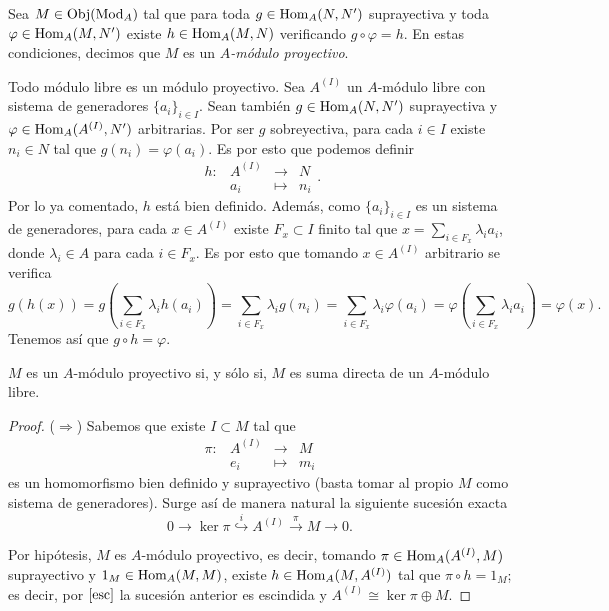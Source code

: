 \documentclass[../main.tex]{subfiles}
\begin{document}
\begin{definition}
	Sea $M\in\text{Obj}(\text{Mod}_A)$ tal que para toda $g\in\text{Hom}_A(N,N')$ suprayectiva y toda $\varphi\in\text{Hom}_A(M,N')$ existe $h\in\text{Hom}_A(M,N)$ verificando $g\circ\varphi=h$. En estas condiciones, decimos que $M$ es un \textit{$A$-módulo proyectivo}.
\end{definition}
\begin{remark}
	Todo módulo libre es un módulo proyectivo. Sea $A^{(I)}$ un $A$-módulo libre con sistema de generadores $\{a_i\}_{i\in I}$. Sean también $g\in\text{Hom}_A(N,N')$ suprayectiva y $\varphi\in\text{Hom}_A(A^{(I)},N')$ arbitrarias. Por ser $g$ sobreyectiva, para cada $i\in I$ existe $n_i\in N$ tal que $g(n_i)=\varphi(a_i)$. Es por esto que podemos definir
	$$
	\begin{array}{rrcl}
	h:&A^{(I)}&\longrightarrow&N\\
	&a_i&\longmapsto&n_i
	\end{array}.$$
	Por lo ya comentado, $h$ está bien definido. Además, como $\{a_i\}_{i\in I}$ es un sistema de generadores, para cada $x\in A^{(I)}$ existe $F_x\subset I$ finito tal que $x=\sum_{i\in F_x}\lambda_i a_i$, donde $\lambda_i\in A$ para cada $i\in F_x$.
	Es por esto que tomando $x\in A^{(I)}$ arbitrario se verifica
	$$g(h(x))=g\left(\sum_{i\in F_x}\lambda_i h(a_i)\right)=\sum_{i\in F_x}\lambda_i g(n_i)=\sum_{i\in F_x}\lambda_i \varphi(a_i)=\varphi\left(\sum_{i\in F_x}\lambda_i a_i\right)=\varphi(x).$$
	Tenemos así que $g\circ h=\varphi$.
\end{remark}

\begin{proposition}
	$M$ es un $A$-módulo proyectivo si, y sólo si, $M$ es suma directa de un $A$-módulo libre.
\end{proposition}
\begin{proof}
	($\Rightarrow$) Sabemos que existe $I\subset M$ tal que
	$$\begin{array}{rrcl}
	\pi:&A^{(I)}&\longrightarrow&M  \\
	&e_i&\longmapsto&m_i
	\end{array}$$
	es un homomorfismo bien definido y suprayectivo (basta tomar al propio $M$ como sistema de generadores). Surge así de manera natural la siguiente sucesión exacta
	$$0\rightarrow\ker{\pi}\overset{i}{\hookrightarrow}A^{(I)}\overset{\pi}{\rightarrow}M\rightarrow0.$$

	Por hipótesis, $M$ es $A$-módulo proyectivo, es decir, tomando $\pi\in\text{Hom}_A(A^{(I)},M)$ suprayectivo y $1_M\in\text{Hom}_A(M,M)$, existe $h\in\text{Hom}_A(M,A^{(I)})$ tal que $\pi\circ h=1_M$; es decir, por $\ref{esc}$ la sucesión anterior es escindida y $A^{(I)}\cong \ker\pi\oplus M$.
\end{proof}
\end{document}
